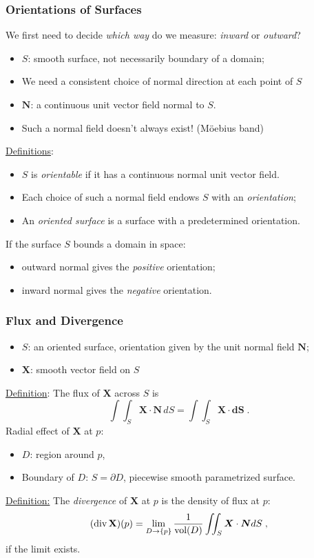 \begin{frame}
  \frametitle{Orientations of Surfaces}

We first need to decide \emph{which way} do we measure: \emph{inward} or \emph{outward}? \pause

  \begin{itemize}
    \item $S$: smooth surface, not necessarily boundary of a domain;
    \item We need a consistent choice of normal direction at each point of $S$
    \item $\textbf{N}$: a continuous unit vector field normal to $S$.
    \item Such a normal field doesn't always exist! (M\"oebius band)
  \end{itemize}

\pause \underline{Definitions}:
\begin{itemize}
  \item $S$ is \emph{orientable} if it has a continuous normal unit vector field.
  \item Each choice of such a normal field endows $S$ with an \emph{orientation};
  \item An \emph{oriented surface} is a surface with a predetermined orientation.
\end{itemize}

\pause If the surface $S$ bounds a domain in space:
\begin{itemize}
  \item outward normal gives the \emph{positive} orientation;
  \item inward normal gives the \emph{negative} orientation.
\end{itemize}
\end{frame}

\begin{frame}
  \frametitle{Flux and Divergence}

\begin{itemize}
  \item $S$: an oriented surface, orientation given by the unit normal field $\textbf{N}$;
  \item $\textbf{X}$: smooth vector field on $S$
\end{itemize}
\underline{Definition}: The flux of $\textbf{X}$ across $S$ is
%
$$\int\!\!\!\int_S \textbf{X}\cdot \textbf{N} \, dS = \int\!\!\!\int_S \textbf{X} \cdot \textbf{dS}\; .$$
%
\pause Radial effect of $\textbf{X}$ at $p$:
\begin{itemize}
  \item $D$: region around $p$,
  \item Boundary of $D$: $S=\partial D$, piecewise smooth parametrized surface.
\end{itemize}

\underline{Definition:} The \emph{divergence} of $\textbf{X}$ at $p$ is the density of flux at $p$:
%
$$(\operatorname{div} \textbf{X})(p) = \lim_{D\to \{p\}} \frac{1}{\text{vol}(D)} \int\!\!\!\int_S \bm{X} \cdot \bm{N}dS \; ,$$
%
if the limit exists.
\end{frame}


